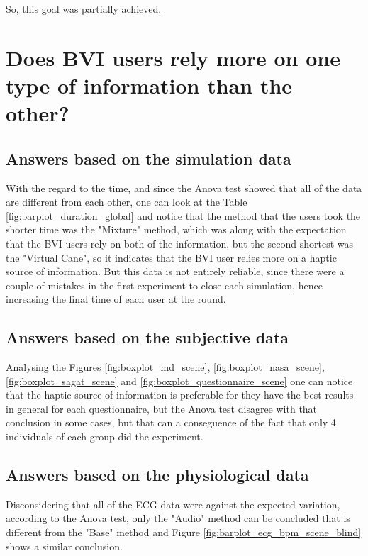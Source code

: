 So, this goal was partially achieved.


\section{Does BVI users rely more on one type of information than the other?}

\subsection{Answers based on the simulation data}

With the regard to the time, and since the Anova test showed that all of the data are different from each other, one can look at the Table \ref{fig:barplot_duration_global} and notice that the method that the users took the shorter time was the "Mixture" method, which was along with the expectation that the BVI users rely on both of the information, but the second shortest was the "Virtual Cane", so it indicates that the BVI user relies more on a haptic source of information. But this data is not entirely reliable, since there were a couple of mistakes in the first experiment to close each simulation, hence increasing the final time of each user at the round.

\subsection{Answers based on the subjective data}

Analysing the Figures \ref{fig:boxplot_md_scene}, \ref{fig:boxplot_nasa_scene}, \ref{fig:boxplot_sagat_scene} and \ref{fig:boxplot_questionnaire_scene} one can notice that the haptic source of information is preferable for they have the best results in general for each questionnaire, but the Anova test disagree with that conclusion in some cases, but that can a conseguence of the fact that only 4 individuals of each group did the experiment. 

\subsection{Answers based on the physiological data}

Disconsidering that all of the ECG data were against the expected variation, according to the Anova test, only the "Audio" method can be concluded that is different from the "Base" method and Figure \ref{fig:barplot_ecg_bpm_scene_blind} shows a similar conclusion.


